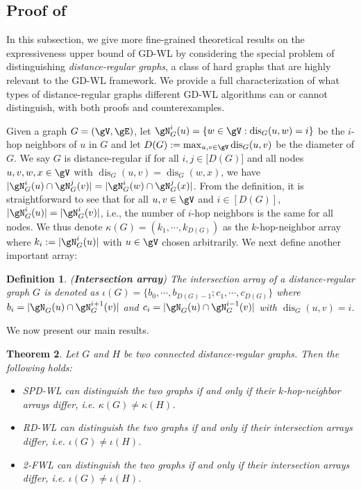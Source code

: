 \documentclass{article} %
\let\cref\crtcref
\newtheorem{theorem}{Theorem}[section]
\newtheorem{definition}[theorem]{Definition}
\newcommand*{\dis}{{\operatorname{dis}}}
\begin{document}
\subsection{Proof of \cref{thm:distance_regular_maintext}}
\label{sec:distance_regular}
In this subsection, we give more fine-grained theoretical results on the expressiveness upper bound of GD-WL by considering the special problem of distinguishing \emph{distance-regular graphs}, a class of hard graphs that are highly relevant to the GD-WL framework. We provide a full characterization of what types of distance-regular graphs different GD-WL algorithms can or cannot distinguish, with both proofs and counterexamples.

Given a graph $G=(\gV,\gE)$, let $\gN_G^i(u)=\{w\in\gV:\dis_G(u,w)=i\}$ be the $i$-hop neighbors of $u$ in $G$ and let $D(G):=\max_{u,v\in\gV}\dis_G(u,v)$ be the diameter of $G$. We say $G$ is distance-regular if for all $i,j\in\mathbb [D(G)]$ and all nodes $u,v,w,x\in\gV$ with $\dis_G(u,v)=\dis_G(w,x)$, we have $|\gN_G^i(u)\cap\gN_G^j(v)|=|\gN_G^i(w)\cap\gN_G^j(x)|$. From the definition, it is straightforward to see that for all $u,v\in\gV$ and $i\in[D(G)]$, $|\gN_G^i(u)|=|\gN_G^i(v)|$, i.e., the number of $i$-hop neighbors is the same for all nodes. We thus denote $\kappa(G)=(k_1,\cdots,k_{D(G)})$ as the $k$-hop-neighbor array where $k_i:=|\gN_G^i(u)|$ with $u\in\gV$ chosen arbitrarily. We next define another important array:
\begin{definition}
    \normalfont (\textbf{Intersection array}) The intersection array of a distance-regular graph $G$ is denoted as $\iota(G)=\{b_0,\cdots,b_{D(G)-1};c_1,\cdots,c_{D(G)}\}$ where $b_i=|\gN_G(u)\cap\gN_G^{i+1}(v)|$ and $c_i=|\gN_G(u)\cap\gN_G^{i-1}(v)|$ with $\dis_G(u,v)=i$.
\end{definition}
We now present our main results.
\begin{theorem}
\label{thm:distance_regular}
    Let $G$ and $H$ be two connected distance-regular graphs. Then the following holds:
    \begin{itemize}[topsep=0pt,leftmargin=30pt]
    \setlength{\itemsep}{0pt}
        \item SPD-WL can distinguish the two graphs if and only if their $k$-hop-neighbor arrays differ, i.e. $\kappa(G)\neq \kappa(H)$.
        \item RD-WL can distinguish the two graphs if and only if their intersection arrays differ, i.e. $\iota(G)\neq\iota(H)$.
        \item 2-FWL can distinguish the two graphs if and only if their intersection arrays differ, i.e. $\iota(G)\neq\iota(H)$.
    \end{itemize}
\end{theorem}
\end{document}
